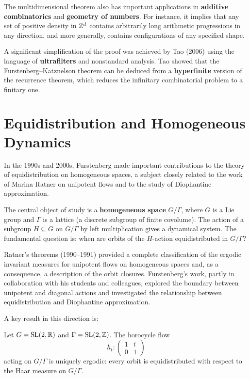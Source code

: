 The multidimensional theorem also has important applications in \textbf{additive combinatorics} and \textbf{geometry of numbers}. For instance, it implies that any set of positive density in \(\mathbb{Z}^d\) contains arbitrarily long arithmetic progressions in any direction, and more generally, contains configurations of any specified shape.

A significant simplification of the proof was achieved by Tao (2006) using the language of \textbf{ultrafilters} and nonstandard analysis. Tao showed that the Furstenberg--Katznelson theorem can be deduced from a \textbf{hyperfinite} version of the recurrence theorem, which reduces the infinitary combinatorial problem to a finitary one.

\section{Equidistribution and Homogeneous Dynamics}

In the 1990s and 2000s, Furstenberg made important contributions to the theory of equidistribution on homogeneous spaces, a subject closely related to the work of Marina Ratner on unipotent flows and to the study of Diophantine approximation.

The central object of study is a \textbf{homogeneous space} \(G/\Gamma\), where \(G\) is a Lie group and \(\Gamma\) is a lattice (a discrete subgroup of finite covolume). The action of a subgroup \(H \subseteq G\) on \(G/\Gamma\) by left multiplication gives a dynamical system. The fundamental question is: when are orbits of the \(H\)-action equidistributed in \(G/\Gamma\)?

Ratner's theorems (1990--1991) provided a complete classification of the ergodic invariant measures for unipotent flows on homogeneous spaces and, as a consequence, a description of the orbit closures. Furstenberg's work, partly in collaboration with his students and colleagues, explored the boundary between unipotent and diagonal actions and investigated the relationship between equidistribution and Diophantine approximation.

A key result in this direction is:

\begin{theorem}
Let \(G = \operatorname{SL}(2,\mathbb{R})\) and \(\Gamma = \operatorname{SL}(2,\mathbb{Z})\). The horocycle flow
\[
h_t: \begin{pmatrix} 1 & t \\ 0 & 1 \end{pmatrix}
\]
acting on \(G/\Gamma\) is uniquely ergodic: every orbit is equidistributed with respect to the Haar measure on \(G/\Gamma\).
\end{theorem}

